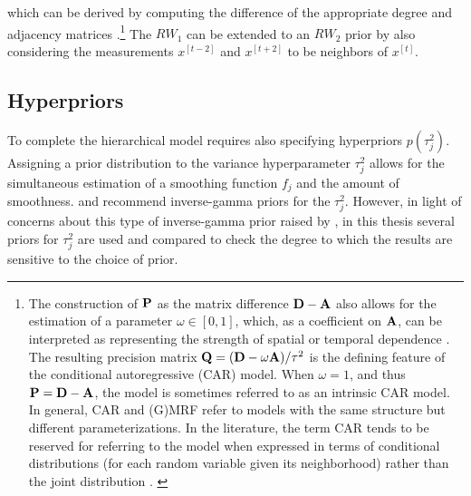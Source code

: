 \noindent which can be derived by computing the difference of the appropriate degree and adjacency matrices .\footnote{The construction of $\mathbf{P}$ as the matrix difference $\mathbf{D} - \mathbf{A}$ also allows for the estimation of a parameter $\omega \in [0,1]$, which, as a coefficient on $\mathbf{A}$, can be interpreted as representing the strength of spatial or temporal dependence . The resulting precision matrix $\mathbf{Q}= (\mathbf{D} - \omega \mathbf{A})/\tau^2$ is the defining feature of the conditional autoregressive (CAR) model.  When $\omega = 1$, and thus $\mathbf{P}= \mathbf{D} - \mathbf{A}$, the model is sometimes referred to as an intrinsic CAR model. In general, CAR and (G)MRF refer to models with the same structure but different parameterizations. In the literature, the term CAR tends to be reserved for referring to the model when expressed in terms of conditional distributions (for each random variable given its neighborhood) rather than the joint distribution . \label{footnote_car}} The $RW_1$ can be extended to an $RW_2$ prior by also considering the measurements $x^{[t-2]}$  and $x^{[t+2]}$ to be neighbors of $x^{[t]}$. 


\subsection{Hyperpriors}
\label{hyperpriors}

To complete the hierarchical model requires also specifying hyperpriors $p(\tau_j^2)$.  Assigning a prior distribution to the variance hyperparameter $\tau_j^2$ allows for the simultaneous estimation of a smoothing function $f_j$ and the amount of smoothness.  and  recommend  inverse-gamma priors for the $\tau_j^2$. However, in light of concerns about this type of inverse-gamma prior raised by , in this thesis several priors for $\tau^2_j$ are used and compared to check the degree to which the results are sensitive to the choice of prior.

